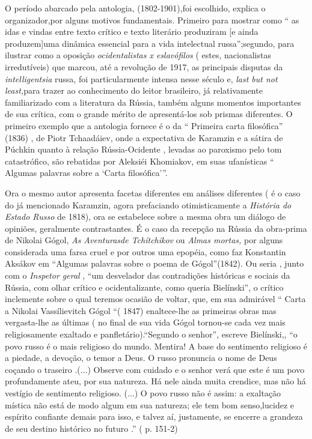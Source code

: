 O período abarcado pela antologia, (1802-1901),foi escolhido, explica o
organizador,por alguns motivos fundamentais. Primeiro para mostrar como
`` as idas e vindas entre texto crítico e texto literário produziram
{[}e ainda produzem{]}uma dinâmica essencial para a vida intelectual
russa'';segundo, para ilustrar como a oposição \emph{ocidentalistas x
eslavófilos} ( estes, nacionalistas irredutíveis) que marcou, até a
revolução de 1917, as principais disputas da \emph{intelligentsia}
russa, foi particularmente intensa nesse século e, \emph{last but not
least,}para trazer ao conhecimento do leitor brasileiro, já
relativamente familiarizado com a literatura da Rússia, também alguns
momentos importantes de sua crítica, com o grande mérito de
apresentá-los sob prismas diferentes. O primeiro exemplo que a antologia
fornece é o da `` Primeira carta filosófica'' (1836) , de Piotr
Tchaadáiev, onde a expectativa de Karamzin e a sátira de Púchkin quanto
à relação Rússia-Ocidente , levadas ao paroxismo pelo tom catastrófico,
são rebatidas por Aleksiéi Khomiakov, em suas ufanísticas `` Algumas
palavras sobre a `Carta filosófica'''.

Ora o mesmo autor apresenta facetas diferentes em análises diferentes (
é o caso do já mencionado Karamzin, agora prefaciando otimisticamente a
\emph{História do Estado Russo} de 1818), ora se estabelece sobre a
mesma obra um diálogo de opiniões, geralmente contrastantes. É o caso da
recepção na Rússia da obra-prima de Nikolai Gógol, \emph{As Aventurasde
Tchítchikov} ou \emph{Almas mortas,} por alguns considerada uma farsa
cruel e por outros uma epopéia, como faz Konstantin Aksákov em ``Algumas
palavras sobre o poema de Gógol''(1842). Ou seria , junto com o
\emph{Inspetor geral} , ``um desvelador das contradições históricas e
sociais da Rússia, com olhar crítico e ocidentalizante, como queria
Bielínski'', o crítico inclemente sobre o qual teremos ocasião de
voltar, que, em sua admirável `` Carta a Nikolai Vassílievitch Gógol ``(
1847) enaltece-lhe as primeiras obras mas vergasta-lhe as últimas ( no
final de sua vida Gógol tornou-se cada vez mais religiosamente exaltado
e panfletário).``Segundo o senhor'', escreve Bielínski,, ``o povo russo
é o mais religioso do mundo. Mentira! A base do sentimento religioso é a
piedade, a devoção, o temor a Deus. O russo pronuncia o nome de Deus
coçando o traseiro .(...) Observe com cuidado e o senhor verá que este é
um povo profundamente ateu, por sua natureza. Há nele ainda muita
crendice, mas não há vestígio de sentimento religioso. (...) O povo
russo não é assim: a exaltação mística não está de modo algum em sua
natureza; ele tem bom senso,lucidez e espírito confiante demais para
isso, e talvez aí, justamente, se encerre a grandeza de seu destino
histórico no futuro .'' ( p. 151-2)

